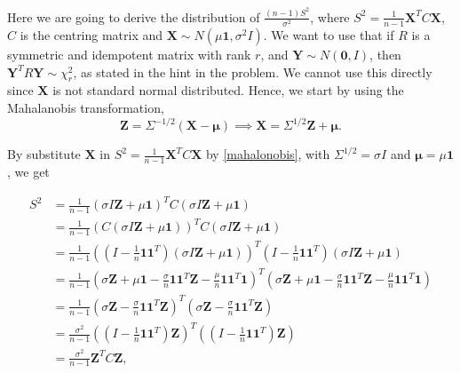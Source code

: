 Here we are going to derive the distribution of $\frac{(n-1)S^2}{\sigma^2}$, where $S^2 = \frac{1}{n-1}\boldsymbol{X}^TC\boldsymbol{X}$, $C$ is the centring matrix and $\boldsymbol{X} \sim N(\mu\boldsymbol{1}, \sigma^2I)$. We want to use that if $R$ is a symmetric and idempotent matrix with rank $r$, and $\boldsymbol{Y} \sim N(\boldsymbol{0}, I)$, then $\boldsymbol{Y}^TR\boldsymbol{Y} \sim \chi_r^2$, as stated in the hint in the problem. We cannot use this directly since $\boldsymbol{X}$ is not standard normal distributed. Hence, we start by using the Mahalanobis transformation,
\begin{equation}
    \label{mahalonobis}
    \boldsymbol{Z} = \Sigma^{-1/2}(\boldsymbol{X} -\boldsymbol{\mu}) \implies \boldsymbol{X} = \Sigma^{1/2}\boldsymbol{Z} +\boldsymbol{\mu}.
\end{equation}

By substitute $\boldsymbol{X}$ in $S^2 = \frac{1}{n-1}\boldsymbol{X}^TC\boldsymbol{X}$ by \eqref{mahalonobis}, with $\Sigma^{1/2} = \sigma I$ and $\boldsymbol{\mu} = \mu \boldsymbol{1}$, we get

\begin{align*}
    S^2 &= \frac{1}{n-1}\left(\sigma I\boldsymbol{Z}+\mu\boldsymbol{1}\right)^TC\left(\sigma I\boldsymbol{Z}+\mu\boldsymbol{1}\right)\\
    &= \frac{1}{n-1}\left(C\left(\sigma I\boldsymbol{Z}+\mu\boldsymbol{1}\right)\right)^TC\left(\sigma I\boldsymbol{Z}+\mu\boldsymbol{1}\right)\\
    &= \frac{1}{n-1}\left(\left(I-\frac{1}{n}\boldsymbol{1}\boldsymbol{1}^T\right)\left(\sigma I\boldsymbol{Z}+\mu\boldsymbol{1}\right)\right)^T\left(I-\frac{1}{n}\boldsymbol{1}\boldsymbol{1}^T\right)\left(\sigma I\boldsymbol{Z}+\mu\boldsymbol{1}\right) \\
    &= \frac{1}{n-1}\left(\sigma\boldsymbol{Z}+\mu\boldsymbol{1}-\frac{\sigma}{n}\boldsymbol{1}\boldsymbol{1}^T\boldsymbol{Z}-\frac{\mu}{n}\boldsymbol{1}\boldsymbol{1}^T\boldsymbol{1}\right)^T\left(\sigma\boldsymbol{Z}+\mu\boldsymbol{1}-\frac{\sigma}{n}\boldsymbol{1}\boldsymbol{1}^T\boldsymbol{Z}-\frac{\mu}{n}\boldsymbol{1}\boldsymbol{1}^T\boldsymbol{1}\right) \\
    &= \frac{1}{n-1}\left(\sigma\boldsymbol{Z}-\frac{\sigma}{n}\boldsymbol{1}\boldsymbol{1}^T\boldsymbol{Z}\right)^T\left(\sigma\boldsymbol{Z}-\frac{\sigma}{n}\boldsymbol{1}\boldsymbol{1}^T\boldsymbol{Z}\right) \\
    &= \frac{\sigma^2}{n-1}\left(\left(I-\frac{1}{n}\boldsymbol{1}\boldsymbol{1}^T\right)\boldsymbol{Z}\right)^T\left(\left(I-\frac{1}{n}\boldsymbol{1}\boldsymbol{1}^T\right)\boldsymbol{Z}\right) \\
    &= \frac{\sigma^2}{n-1}\boldsymbol{Z}^TC\boldsymbol{Z},
\end{align*}

